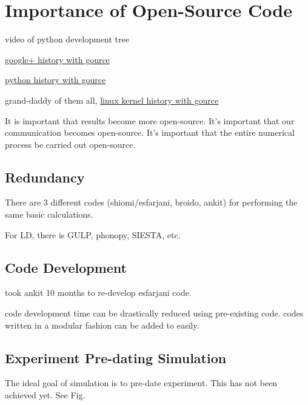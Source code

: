\section{Importance of Open-Source Code}

video of python development tree

\href{http://www.youtube.com/watch?v=3poNeQHUKrs}
{google+ history with gource}

\href{http://www.youtube.com/watch?v=cNBtDstOTmA}
{python history with gource}

grand-daddy of them all, 
\href{http://www.youtube.com/watch?v=pOSqctHH9vY}
{linux kernel history with gource}

It is important that results become more open-source.  It's important 
that our communication becomes open-source. It's important that the 
entire numerical process be carried out open-source. 

\subsection{Redundancy}

There are 3 different codes (shiomi/esfarjani, broido, ankit) for 
performing the same basic calculations.

For LD, there is GULP, phonopy, SIESTA, etc.

\subsection{Code Development}

took ankit 10 months to re-develop esfarjani code.  

code development time can be drastically reduced using pre-existing code. 
codes written in a modular fashion can be added to easily.

\subsection{Experiment Pre-dating Simulation}
The ideal goal of simulation is to pre-date experiment.  This has not 
been achieved yet.  See Fig.


